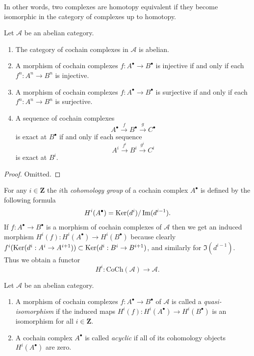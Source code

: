 \noindent
In other words, two complexes are homotopy equivalent if they become
isomorphic in the category of complexes up to homotopy.

\begin{lemma}
\label{lemma-cat-cochain-abelian}
Let $\mathcal{A}$ be an abelian category.
\begin{enumerate}
\item The category of cochain complexes in $\mathcal{A}$ is
abelian.
\item A morphism of cochain complexes
$f : A^\bullet \to B^\bullet$ is injective
if and only if each $f^n : A^n \to B^n$ is injective.
\item A morphism of cochain complexes
$f : A^\bullet \to B^\bullet$ is surjective
if and only if each $f^n : A^n \to B^n$ is surjective.
\item A sequence of cochain complexes
$$
A^\bullet \xrightarrow{f} B^\bullet \xrightarrow{g} C^\bullet
$$
is exact at $B^\bullet$ if and only if each sequence
$$
A^i \xrightarrow{f^i} B^i \xrightarrow{g^i} C^i
$$
is exact at $B^i$.
\end{enumerate}
\end{lemma}

\begin{proof}
Omitted.
\end{proof}

\noindent
For any $i \in \mathbf{Z}$ the $i$th {\it cohomology group}
of a cochain complex $A^\bullet$ is defined by
the following formula
$$
H^i(A^\bullet) = \mathop{\mathrm{Ker}}(d^i)/\mathop{\mathrm{Im}}(d^{i - 1}).
$$
If $f : A^\bullet \to B^\bullet$ is a morphism of cochain
complexes of $\mathcal{A}$ then we get an induced
morphism $H^i(f) : H^i(A^\bullet) \to H^i(B^\bullet)$
because clearly
$f^i(\mathop{\mathrm{Ker}}(d^i : A^i \to A^{i + 1})) \subset
\mathop{\mathrm{Ker}}(d^i : B^i \to B^{i + 1})$, and similarly
for $\Im(d^{i - 1})$.
Thus we obtain a functor
$$
H^i : \text{CoCh}(\mathcal{A}) \longrightarrow \mathcal{A}.
$$

\begin{definition}
\label{definition-quasi-isomorphism-cochain}
Let $\mathcal{A}$ be an abelian category.
\begin{enumerate}
\item A morphism of cochain complexes $f : A^\bullet \to B^\bullet$
of $\mathcal{A}$ is called a {\it quasi-isomorphism} if the induced
maps $H^i(f) : H^i(A^\bullet) \to H^i(B^\bullet)$
is an isomorphism for all $i \in \mathbf{Z}$.
\item A cochain complex $A^\bullet$ is called
{\it acyclic} if all of its cohomology objects
$H^i(A^\bullet)$ are zero.
\end{enumerate}
\end{definition}

